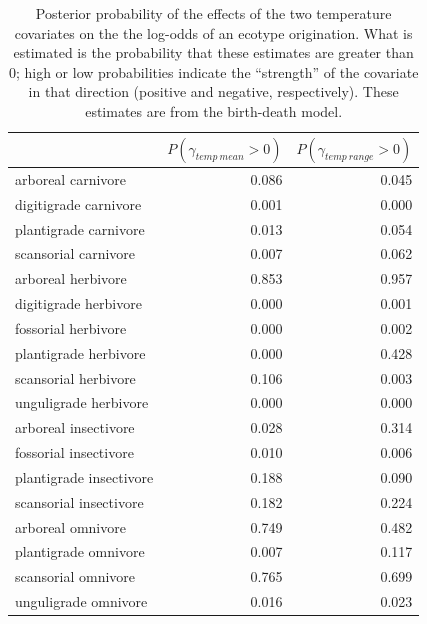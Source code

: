 \documentclass[12pt,letterpaper]{article}
\begin{document}
\begin{table}[ht]
  \centering
  \caption[Posterior probablity of effects of temperature on origination]{Posterior probability of the effects of the two temperature covariates on the the log-odds of an ecotype origination. What is estimated is the probability that these estimates are greater than 0; high or low probabilities indicate the ``strength'' of the covariate in that direction (positive and negative, respectively). These estimates are from the birth-death model.}
  \label{tab:origin_temp}
  \begin{tabular}{ l r r }
    \hline
    & \(P(\gamma_{temp\ mean} > 0)\) & \(P(\gamma_{temp\ range} > 0)\) \\ 
    \hline
    arboreal carnivore & 0.086 & 0.045 \\ 
    digitigrade carnivore & 0.001 & 0.000 \\ 
    plantigrade carnivore & 0.013 & 0.054 \\ 
    scansorial carnivore & 0.007 & 0.062 \\ 
    arboreal herbivore & 0.853 & 0.957 \\ 
    digitigrade herbivore & 0.000 & 0.001 \\ 
    fossorial herbivore & 0.000 & 0.002 \\ 
    plantigrade herbivore & 0.000 & 0.428 \\ 
    scansorial herbivore & 0.106 & 0.003 \\ 
    unguligrade herbivore & 0.000 & 0.000 \\ 
    arboreal insectivore & 0.028 & 0.314 \\ 
    fossorial insectivore & 0.010 & 0.006 \\ 
    plantigrade insectivore & 0.188 & 0.090 \\ 
    scansorial insectivore & 0.182 & 0.224 \\ 
    arboreal omnivore & 0.749 & 0.482 \\ 
    plantigrade omnivore & 0.007 & 0.117 \\ 
    scansorial omnivore & 0.765 & 0.699 \\ 
    unguligrade omnivore & 0.016 & 0.023 \\ 
    \hline
  \end{tabular}
\end{table}
\end{document}
